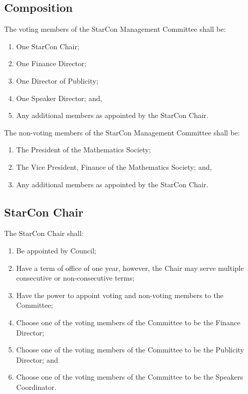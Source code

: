 \subsection{Composition}
The voting members of the StarCon Management Committee shall be:
\begin{enumerate}
\item One StarCon Chair;
\item One Finance Director;
\item One Director of Publicity;
\item One Speaker Director; and,
\item Any additional members as appointed by the StarCon Chair.
\end{enumerate}

The non-voting members of the StarCon Management Committee shall be:
\begin{enumerate}
\item The President of the Mathematics Society;
\item The Vice President, Finance of the Mathematics Society; and,
\item Any additional members as appointed by the StarCon Chair.

\end{enumerate}

\subsection{StarCon Chair}
The StarCon Chair shall:
\begin{enumerate}
\item Be appointed by Council;
\item Have a term of office of one year, however, the Chair may serve multiple consecutive or non-consecutive terms;
\item Have the power to appoint voting and non-voting members to the Committee;
\item Choose one of the voting members of the Committee to be the Finance Director;
\item Choose one of the voting members of the Committee to be the Publicity Director; and
\item Choose one of the voting members of the Committee to be the Speakers Coordinator.
\end{enumerate}

